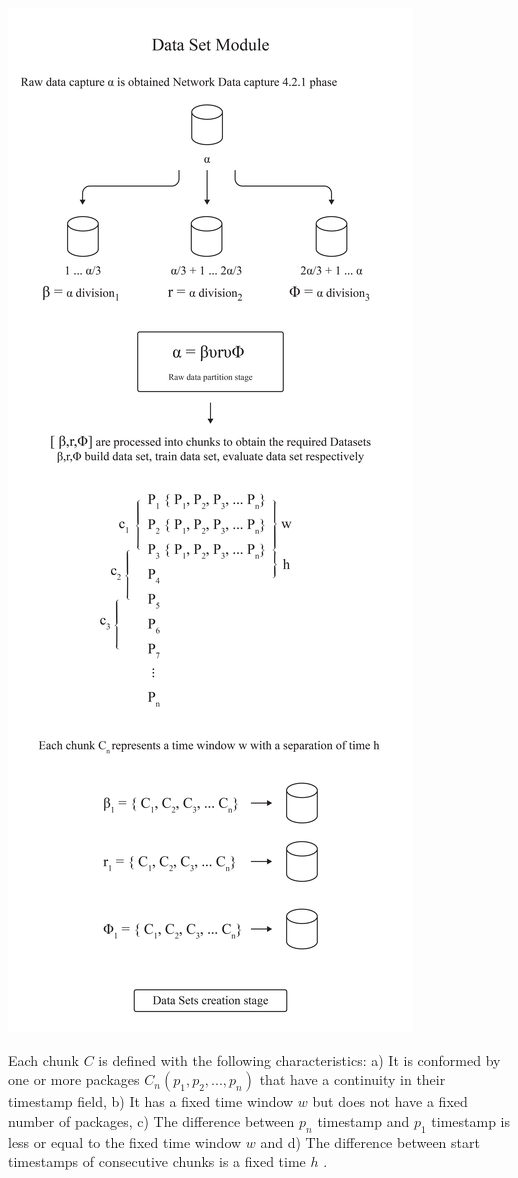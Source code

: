 \documentclass{article}
\begin{document}
	\begin{center}\includegraphics[scale=0.2]{fig-three} \end{center}
	
Each chunk $C$ is defined with the following characteristics: a) It is conformed by one or more packages $C_n(p_1, p_2,...,p_n)$ that have a continuity in their timestamp field, b) It has a fixed time window $w$ but does not have a fixed number of packages, c) The difference between $p_n$ timestamp and $p_1$ timestamp is less or equal to the fixed time window $w$ and d) The difference between start timestamps of consecutive chunks is a fixed time $h$ .
\end{document}
